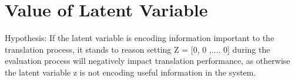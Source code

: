 



\section{Value of Latent Variable} 

Hypothesis: If the latent variable is encoding information important to the translation process, it stands to reason setting Z = [0, 0 ,.... 0] during the evaluation process will negatively impact translation performance, as otherwise the latent variable z is not encoding useful information in the system.


